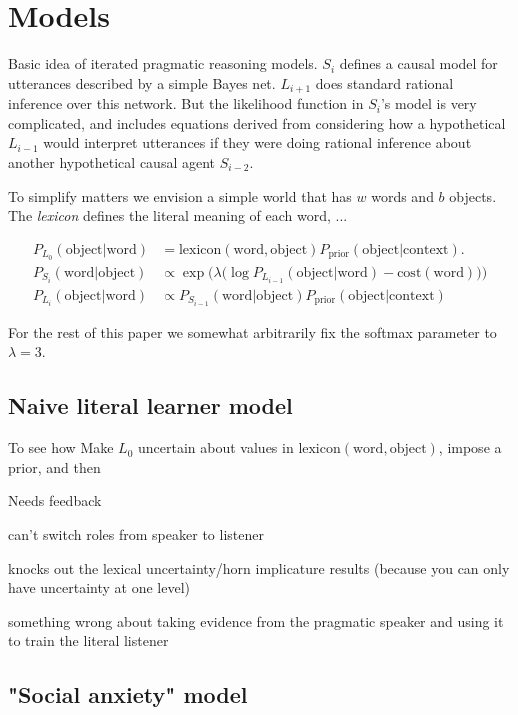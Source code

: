 \documentclass{article} %
\begin{document}
\section{Models}

Basic idea of iterated pragmatic reasoning models. $S_i$ defines a causal model for utterances described by a simple Bayes net. $L_{i+1}$ does standard rational inference over this network. But the likelihood function in $S_i$'s model is very complicated, and includes equations derived from considering how a hypothetical $L_{i-1}$ would interpret utterances if they were doing rational inference about another hypothetical causal agent $S_{i-2}$.

To simplify matters we envision a simple world that has $w$ words and $b$ objects. The \textit{lexicon} defines the literal meaning of each word, ...

\newcommand{\word}{\text{word}}
\newcommand{\obj}{\text{object}}
\begin{align*}
P_{L_0}(\obj | \word) &= \text{lexicon}(\word, \obj) P_{\text{prior}}(\obj | \text{context}). \\
P_{S_i}(\word | \obj) &\propto \exp\Big(\lambda \big(\log P_{L_{i - 1}}(\obj | \word) - \text{cost}(\word)\big)\Big) \\
P_{L_i}(\obj | \word) &\propto P_{S_{i-1}}(\word | \obj) P_{\text{prior}}(\obj | \text{context})
\end{align*}

For the rest of this paper we somewhat arbitrarily fix the softmax parameter to $\lambda = 3$.

\subsection{Naive literal learner model}

To see how 
Make $L_0$ uncertain about values in $\text{lexicon}(\word, \obj)$, impose a prior, and then 

Needs feedback

can't switch roles from speaker to listener

knocks out the lexical uncertainty/horn implicature results (because you can only have uncertainty at one level) 

something wrong about taking evidence from the pragmatic speaker and using it to train the literal listener

\subsection{"Social anxiety" model}
\end{document}
